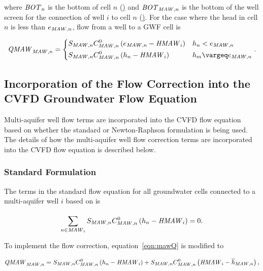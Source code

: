 \noindent where $\mathit{BOT}_n$ is the bottom of cell $n$ (\ul) and $\mathit{BOT}_{\mathit{MAW},n}$ is the bottom of the well screen for the connection of well $i$ to cell $n$ (\ul). For the case where the head in cell $n$ is less than $e_{\mathit{MAW},n}$, flow from a well to a GWF cell is

\begin{align}
	\label{eqn:mawQc2}
	\mli{QMAW}_{\mli{MAW},n} = \begin{dcases}
		S_{\mli{MAW},n} C_{\mli{MAW},n}^0 \left( e_{\mli{MAW},n} - \mli{HMAW}_{i}  \right) &  h_n < e_{\mli{MAW},n} \\
		S_{\mli{MAW},n} C_{\mli{MAW},n}^0 \left( h_n - \mli{HMAW}_{i} \right) & h_m \ge e_{\mli{MAW},n}
	\end{dcases} .
\end{align}

\subsection{Incorporation of the Flow Correction into the CVFD Groundwater Flow Equation}
Multi-aquifer well flow terms are incorporated into the CVFD flow equation \citep[eq. 6--1]{modflow6gwf} based on whether the standard or Newton-Raphson formulation is being used. The details of how the multi-aquifer well flow correction terms are incorporated into the CVFD flow equation is described below.

\subsubsection{Standard Formulation}

The terms in the standard flow equation for all groundwater cells connected to a multi-aquifer well $i$ based on \citep[eq. 7--55]{modflow6gwf} is

\begin{equation}
	\label{mawStdFlow}
	\sum\limits_{n \in \mathit{MAW}_{i}}^{} S_{\mathit{MAW},n} C_{\mathit{MAW},n}^{0} \left( h_{n} - \mathit{HMAW}_{i} \right) = 0 .
\end{equation}

\noindent To implement the flow correction, equation~\ref{eqn:mawQ} is modified to

\begin{align}
	\label{eqn:mawQfdc}
	\mathit{QMAW}_{\mathit{MAW},n} = S_{\mathit{MAW},n} C_{\mathit{MAW},n}^0 \left( h_n - \mathit{HMAW}_{i} \right) + S_{\mathit{MAW},n} C_{\mathit{MAW},n}^0 \left( \mathit{HMAW}_{i} - \overline{h}_{\mathit{MAW},n} \right),
\end{align}

